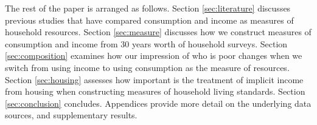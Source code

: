The rest of the paper is arranged as follows.  Section \ref{sec:literature} discusses previous studies that have compared consumption and income as measures of household resources. Section \ref{sec:measure} discusses how we construct measures of consumption and income from 30 years worth of household surveys. Section \ref{sec:composition} examines how our impression of who is poor changes when we switch from using income to using consumption as the measure of resources. Section \ref{sec:housing} assesses how important is the treatment of implicit income from housing when constructing measures of household living standards. Section \ref{sec:conclusion} concludes. Appendices provide more detail on the underlying data sources, and supplementary results.
